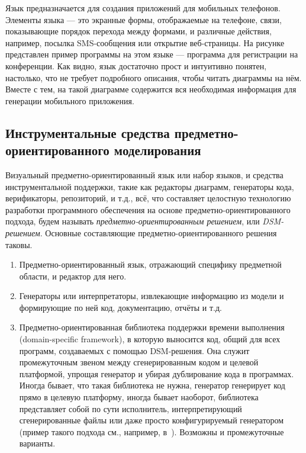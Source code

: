 Язык предназначается для создания приложений для мобильных телефонов. 
Элементы языка --- это экранные формы, отображаемые на телефоне, связи, 
показывающие порядок перехода между формами, и различные действия, например, 
посылка SMS-сообщения или открытие веб-страницы. На рисунке представлен пример 
программы на этом языке --- программа для регистрации на конференции. 
Как видно, язык достаточно прост и интуитивно понятен, настолько, что не требует 
подробного описания, чтобы читать диаграммы на нём. Вместе с тем, на такой 
диаграмме содержится вся необходимая информация для генерации мобильного 
приложения.

\subsection{Инструментальные средства предметно-ориентированного моделирования}
Визуальный предметно-ориентированный язык или набор языков, и средства 
инструментальной поддержки, такие как редакторы диаграмм, генераторы кода, 
верификаторы, репозиторий, и т.д., всё, что составляет целостную технологию 
разработки программного обеспечения на основе предметно-ориентированного 
подхода, будем называть \textit{предметно-ориентированным решением}, или \textit{DSM-решением}. 
Основные составляющие предметно-ориентированного решения таковы.

\begin{enumerate}
	\item Предметно-ориентированный язык, отражающий специфику предметной области, и редактор для него.
	\item Генераторы или интерпретаторы, извлекающие информацию из модели и формирующие по ней код, 
		документацию, отчёты и т.д.
	\item Предметно-ориентированная библиотека поддержки времени выполнения 
		(domain-specific framework), в которую выносится код, общий для всех 
		программ, создаваемых с помощью \ac{DSM}-решения. Она служит промежуточным звеном 
		между сгенерированным кодом и целевой платформой, упрощая генератор и убирая 
		дублирование кода в программах. Иногда бывает, что такая библиотека не 
		нужна, генератор генерирует код прямо в целевую платформу, иногда бывает 
		наоборот, библиотека представляет собой по сути исполнитель, интерпретирующий 
		сгенерированные файлы или даже просто конфигурируемый генератором (пример такого 
		подхода см., например, в~\cite{lyadova2010instruments}). Возможны и промежуточные варианты.
\end{enumerate}

